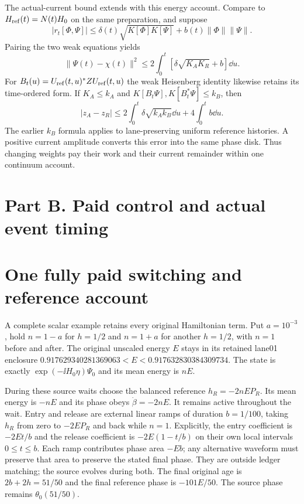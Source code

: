 The actual-current bound extends with this energy account. Compare to $H_{\rm ref}(t)=N(t)H_0$ on the same preparation, and suppose
\[
 |r_t[\Phi,\Psi]|\le\delta(t)\sqrt{K[\Phi]K[\Psi]}
                         +b(t)\|\Phi\|\|\Psi\|.
\]
Pairing the two weak equations yields
\[
 \|\Psi(t)-\chi(t)\|^2\le2\int_0^t
        [\delta\sqrt{K_AK_R}+b]\dd u.
\]
For $B_t(u)=U_{\rm ref}(t,u)^*ZU_{\rm ref}(t,u)$ the weak Heisenberg identity likewise retains its time-ordered form. If $K_A\le k_A$ and $K[B_t\Psi],K[B_t^*\Psi]\le k_B$, then
\[
 |z_A-z_R|\le2\int_0^t\delta\sqrt{k_Ak_B}\dd u+4\int_0^t b\dd u.
\]
The earlier $k_B$ formula applies to lane-preserving uniform reference histories. A positive current amplitude converts this error into the same phase disk. Thus changing weights pay their work and their current remainder within one continuum account.

\section*{Part B. Paid control and actual event timing}
\section{One fully paid switching and reference account}
A complete scalar example retains every original Hamiltonian term. Put $a=10^{-3}$, hold $n=1-a$ for $h=1/2$ and $n=1+a$ for another $h=1/2$, with $n=1$ before and after. The original unscaled energy $E$ stays in its retained lane01 enclosure $0.917629340281369063<E<0.917632830384309734$. The state is exactly $\exp(-\ii H_0\eta)\Psi_0$ and its mean energy is $nE$.

During these source waits choose the balanced reference $h_R=-2nEP_R$. Its mean energy is $-nE$ and its phase obeys $\dot\beta=-2nE$. It remains active throughout the wait. Entry and release are external linear ramps of duration $b=1/100$, taking $h_R$ from zero to $-2EP_R$ and back while $n=1$. Explicitly, the entry coefficient is $-2Et/b$ and the release coefficient is $-2E(1-t/b)$ on their own local intervals $0\le t\le b$. Each ramp contributes phase area $-Eb$; any alternative waveform must preserve that area to preserve the stated final phase. They are outside ledger matching; the source evolves during both. The final original age is $2b+2h=51/50$ and the final reference phase is $-101E/50$. The source phase remains $\theta_0(51/50)$.

